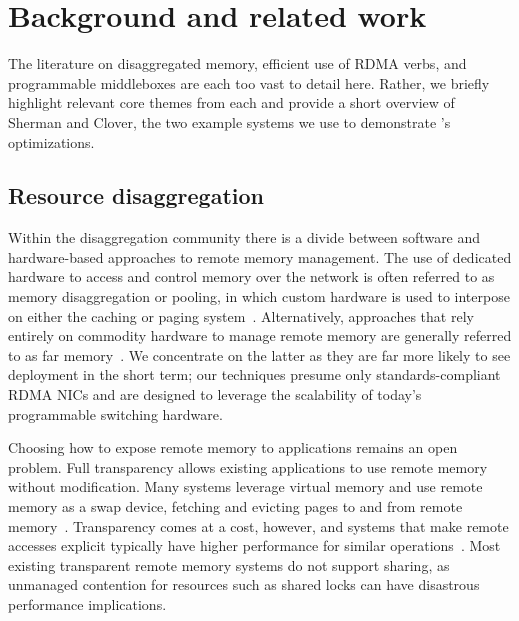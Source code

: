\section{Background and related work}

The literature on disaggregated memory, efficient use of RDMA verbs,
and programmable middleboxes are each too vast to detail here.
Rather, we briefly highlight relevant core themes from each and 
provide a short overview of Sherman and Clover, the two example
systems we use to demonstrate \sword's optimizations.

\subsection{Resource disaggregation}

Within the disaggregation community there is a divide between software
and hardware-based approaches to remote memory management.  The use of
dedicated hardware to access and control memory over the network is
often referred to as memory disaggregation or pooling, in which custom hardware
is used to interpose on either the caching or paging
system~\cite{dredbox,kona}.  Alternatively, approaches that rely
entirely on commodity hardware to manage remote memory are generally
referred to as far memory~\cite{reigons,fastswap, legoos,
  clover, lite}.  We concentrate on the latter as they are far more
likely to see deployment in the short term; our techniques presume
only standards-compliant RDMA NICs and are designed to leverage the
scalability of today's programmable switching hardware.

Choosing how to expose remote memory to applications remains an open
problem. Full transparency allows existing applications to use remote memory without modification. Many systems leverage
virtual memory and use remote memory as a swap device, fetching and
evicting pages to and from remote
memory~\cite{fastswap,GMS,infiniswap,leap,ramcloud}. Transparency
comes at a cost, however, and systems that make remote accesses
explicit typically have higher performance for similar
operations~\cite{aifm}.  Most existing transparent remote memory
systems do not support sharing, as unmanaged contention for resources
such as shared locks can have disastrous performance implications.



